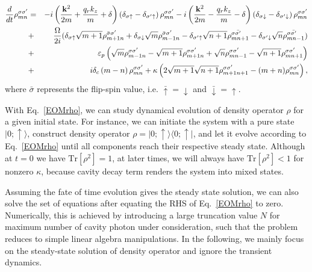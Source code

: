 \documentclass[atoms,article,submit,moreauthors,pdftex,12pt,a4paper]{mdpi}
\def\ba{\begin{eqnarray}}
\def\ea{\end{eqnarray}}
\begin{document}
\ba 
\frac{d}{dt}\rho_{mn}^{\sigma\sigma'} 
& = & -i\left(\frac{{\bf k}^{2}}{2m}+\frac{q_{r}k_{z}}{m}+\delta\right)\left(\delta_{\sigma\uparrow}-\delta_{\sigma'\uparrow}\right)\rho_{mn}^{\sigma\sigma'}
-  i\left(\frac{{\bf k}^{2}}{2m}-\frac{q_{r}k_{z}}{m}-\delta\right)\left(\delta_{\sigma\downarrow}-\delta_{\sigma'\downarrow}\right)\rho_{mn}^{\sigma\sigma'}\nonumber\\
& + & \frac{\Omega}{2i}(\delta_{\sigma\uparrow}\sqrt{m+1}\rho_{m+1n}^{\bar{\sigma}\sigma'}
+\delta_{\sigma\downarrow}\sqrt{m}\rho_{m-1n}^{\bar{\sigma}\sigma'}
-\delta_{\sigma'\uparrow}\sqrt{n+1}\rho_{mn+1}^{\sigma\bar{\sigma'}}
-\delta_{\sigma'\downarrow}\sqrt{n}\rho_{mn-1}^{\sigma\bar{\sigma'}})\nonumber\\
& + & \varepsilon_{p}\left(\sqrt{m}\rho_{m-1n}^{\sigma\sigma'}-\sqrt{m+1}\rho_{m+1n}^{\sigma\sigma'}+\sqrt{n}\rho_{mn-1}^{\sigma\sigma'}-\sqrt{n+1}\rho_{mn+1}^{\sigma\sigma'}\right)\nonumber\\
& + & i\delta_{c}\left(m-n\right)\rho_{mn}^{\sigma\sigma'}
+ \kappa\left(2\sqrt{m+1}\sqrt{n+1}\rho_{m+1n+1}^{\sigma\sigma'}-(m+n)\rho_{mn}^{\sigma\sigma'}\right),\label{EOMrho}
\ea
where $\bar{\sigma}$ represents the flip-spin value, i.e. $\bar{\uparrow}=\downarrow$ and $\bar{\downarrow}=\uparrow$. 

With Eq.~\ref{EOMrho}, we can study dynamical evolution of density operator $\rho$ for a given initial state. For instance, we can initiate the system with a pure state $|0;\uparrow\rangle$, construct density operator $\rho=|0;\uparrow\rangle\langle0;\uparrow|$, and let it evolve according to Eq.~\ref{EOMrho} until all components reach their respective steady state. Although at $t=0$ we have $\text{Tr}[\rho^2]=1$, at later times, we will always have $\text{Tr}[\rho^2]<1$ for nonzero $\kappa$, because cavity decay term renders the system into mixed states. 

Assuming the fate of time evolution gives the steady state solution, we can also solve the set of equations after equating the RHS of Eq.~\ref{EOMrho} to zero. Numerically, this is achieved by introducing a large truncation value $N$ for maximum number of cavity photon under consideration, such that the problem reduces to simple linear algebra manipulations. In the following, we mainly focus on the steady-state solution of density operator and ignore the transient dynamics.
\end{document}
